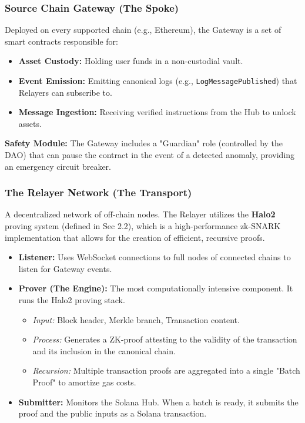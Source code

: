 \documentclass[11pt,a4paper]{article}
\begin{document}
\subsubsection{Source Chain Gateway (The Spoke)}
Deployed on every supported chain (e.g., Ethereum), the Gateway is a set of smart contracts responsible for:
\begin{itemize}
    \item \textbf{Asset Custody:} Holding user funds in a non-custodial vault.
    \item \textbf{Event Emission:} Emitting canonical logs (e.g., \texttt{LogMessagePublished}) that Relayers can subscribe to.
    \item \textbf{Message Ingestion:} Receiving verified instructions from the Hub to unlock assets.
\end{itemize}
\textbf{Safety Module:} The Gateway includes a "Guardian" role (controlled by the DAO) that can pause the contract in the event of a detected anomaly, providing an emergency circuit breaker.

\subsubsection{The Relayer Network (The Transport)}
A decentralized network of off-chain nodes. The Relayer utilizes the \textbf{Halo2} proving system (defined in Sec 2.2), which is a high-performance zk-SNARK implementation that allows for the creation of efficient, recursive proofs.
\begin{itemize}
    \item \textbf{Listener:} Uses WebSocket connections to full nodes of connected chains to listen for Gateway events.
    \item \textbf{Prover (The Engine):} The most computationally intensive component. It runs the Halo2 proving stack.
        \begin{itemize}
            \item \textit{Input:} Block header, Merkle branch, Transaction content.
            \item \textit{Process:} Generates a ZK-proof attesting to the validity of the transaction and its inclusion in the canonical chain.
            \item \textit{Recursion:} Multiple transaction proofs are aggregated into a single "Batch Proof" to amortize gas costs.
        \end{itemize}
    \item \textbf{Submitter:} Monitors the Solana Hub. When a batch is ready, it submits the proof and the public inputs as a Solana transaction.
\end{itemize}
\end{document}
